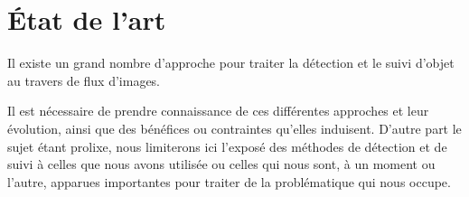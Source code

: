 \documentclass[a4paper,12pt]{report}
\begin{document}
%


\chapter{\'{E}tat de l'art}

Il existe un grand nombre d'approche pour traiter la détection et le suivi d'objet au travers de flux d'images. 

Il est nécessaire de prendre connaissance de ces différentes approches et leur évolution, ainsi que des bénéfices ou contraintes qu'elles induisent. D'autre part le sujet étant prolixe, nous limiterons ici l'exposé des méthodes de détection et de suivi à celles que nous avons utilisée ou celles qui nous sont, à un moment ou l'autre, apparues importantes pour traiter de la problématique qui nous occupe.
\end{document}
